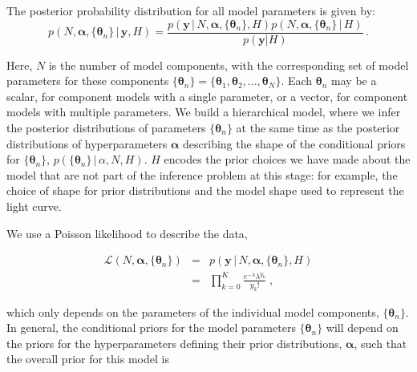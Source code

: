 \documentclass[12pt]{emulateapj}
\newcommand{\given}{\,|\,}
\newcommand{\counts}{y}
\newcommand{\likelihood}{{\mathcal L}}
\begin{document}

The posterior probability distribution for all model parameters is given by:
\begin{equation}
p(N, \bm{\alpha},\{\bm{\theta}_n \} \given \bm{\counts}, H) = \frac{p(\bm{\counts} \given N, \bm{\alpha}, \{\bm{\theta}_n \}, H) p(N, \bm{\alpha}, \{\bm{\theta}_n \} \given H)}{p(\bm{\counts} | H)} \, .
\end{equation}

Here, $N$ is the number of model components, with the corresponding set of model parameters for these components $\{\bm{\theta}_n\} = \{ \bm{\theta}_1, \bm{\theta}_2, ..., \bm{\theta}_N \}$. Each $\bm{\theta}_n$ may be a scalar, for component models with a single parameter, or a vector, for component models with multiple parameters. 
We build a hierarchical model, where we infer the posterior distributions of parameters $\{\bm{\theta}_n\}$ at the same time as the posterior distributions of hyperparameters $\bm{\alpha}$ describing the shape
of the conditional priors for  $\{\bm{\theta}_n\}$, $p(\{\bm{\theta}_n\}\given \alpha, N, H)$.
$H$ encodes the prior choices we have
made about the model that are not part of the inference problem at this stage: for example, the choice of shape for prior distributions and the model shape used to represent the light curve.

We use a Poisson likelihood to describe the data,

\begin{eqnarray}
\likelihood(N, \bm{\alpha}, \{\bm{\theta}_n \}) & = & p(\bm{\counts} \given N, \bm{\alpha}, \{\bm{\theta}_n \}, H) \\ \nonumber
 &= & \prod\limits_{k=0}^{K}{ \frac{e^{-\lambda} \lambda^{y_k} }{y_k! }} \; ,
\end{eqnarray}

which only depends on the parameters of the individual model components, $\{\bm{\theta}_n\}$. In general, the conditional priors for the model 
parameters $\{\bm{\theta}_n\}$ will depend on the priors for the hyperparameters defining their prior distributions, $\bm{\alpha}$, such that the
overall prior for this model is
\end{document}
